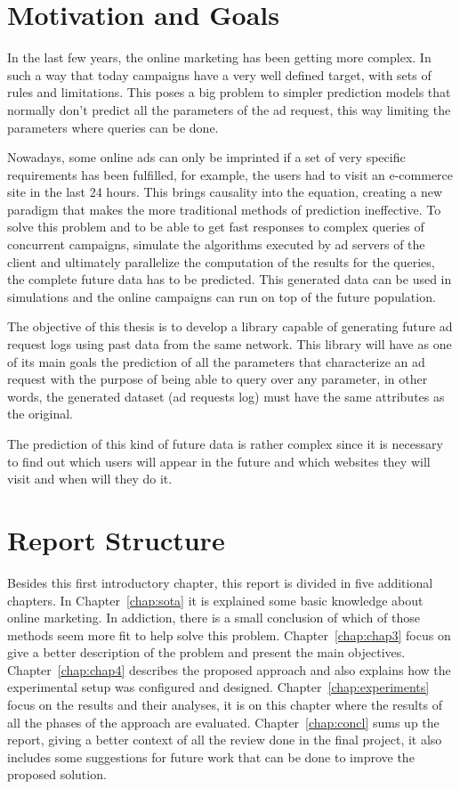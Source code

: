 \section{Motivation and Goals} \label{sec:goals}

In the last few years, the online marketing has been getting more complex. In
such a way that today campaigns have a very well defined target, with
sets of rules and limitations. This poses a big problem to
simpler prediction models that normally don't predict all the parameters of the
ad request, this way limiting the parameters where queries can be done.


Nowadays, some online ads can only be imprinted if a set of very specific requirements has been fulfilled, for example,
the users had to visit an e-commerce site in the last 24 hours. This brings causality into the equation, creating a new paradigm that makes 
the more traditional methods of prediction ineffective. To solve this problem
and to be able to get fast responses to complex queries of concurrent campaigns,
simulate the algorithms executed by ad servers of the client
and ultimately parallelize the computation of the results for the
queries,
the complete future data has to be predicted. This generated data
can be used in simulations and the online campaigns can run on top of the future population.

The objective of this thesis is to develop a library capable of generating
future ad request logs using past data from the same network.
This library will have as one of its main goals the prediction of all the parameters that characterize an
ad request with the purpose of being able to query over any parameter, in other
words, the generated dataset (ad requests log) must have the same attributes as the original.

The prediction of this kind of future data is rather complex since it is
necessary to find out which users will appear in the future and which websites they
will visit and when will they do it.

\section{Report Structure} \label{sec:struct}

Besides this first introductory chapter, this report is divided in five additional chapters.
In Chapter~\ref{chap:sota} it is explained some basic knowledge about online marketing. In addiction, there is
a small conclusion of which of those methods seem more fit to help solve this problem.
Chapter~\ref{chap:chap3} focus on give a better description of the problem and
present the main objectives.
Chapter~\ref{chap:chap4} describes the proposed approach and also explains how
the experimental setup was configured and designed.
Chapter~\ref{chap:experiments} focus on the results and their analyses, it is on
this chapter where the results of all the phases of the approach are evaluated.
Chapter~\ref{chap:concl} sums up the report, giving a better context of all the
review done in the final project, it also includes some suggestions for future
work that can be done to improve the proposed solution.

